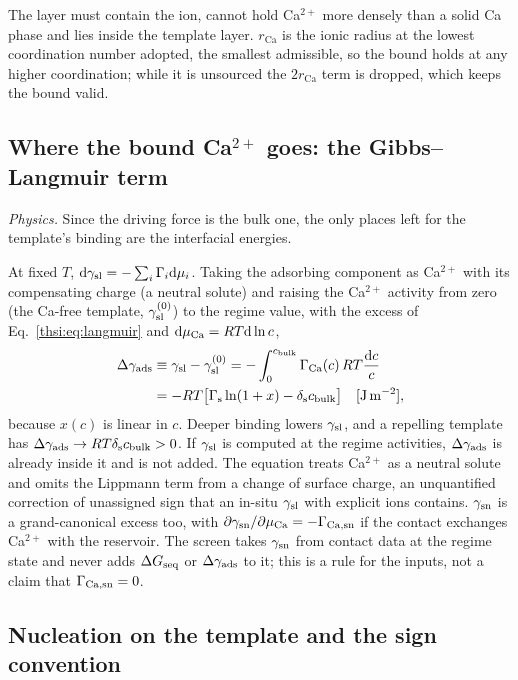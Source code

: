 The layer must contain the ion, cannot hold Ca$^{2+}$ more densely than a solid Ca phase and lies inside
the template layer. $r_\mathrm{Ca}$ is the ionic radius at the lowest coordination number adopted, the
smallest admissible, so the bound holds at any higher coordination; while it is unsourced the
$2r_\mathrm{Ca}$ term is dropped, which keeps the bound valid.

\subsection{Where the bound Ca$^{2+}$ goes: the Gibbs--Langmuir term}\label{thsi:sec:gibbs}

\textit{Physics.} Since the driving force is the bulk one, the only places left for the template's
binding are the interfacial energies.

At fixed $T$, $\mathrm{d}\gamma_\mathrm{sl}=-\sum_i\Gamma_i\mathrm{d}\mu_i$. Taking the adsorbing component as Ca$^{2+}$ with its
compensating charge (a neutral solute) and raising the Ca$^{2+}$ activity from zero (the Ca-free
template, $\gamma_\mathrm{sl}^{(0)}$) to the regime value, with the excess of Eq.~\eqref{thsi:eq:langmuir} and
$\mathrm{d}\mu_\mathrm{Ca}=R T\mathrm{d}\ln c$,
\begin{equation}\label{thsi:eq:gibbs}
\begin{aligned}
\Delta\gamma_\mathrm{ads}&\equiv\gamma_\mathrm{sl}-\gamma_\mathrm{sl}^{(0)}=-\int_0^{c_\mathrm{bulk}}\Gamma_\mathrm{Ca}(c)\,R T\frac{\mathrm{d} c}{c}\\
&=-R T\big[\Gamma_\mathrm{s}\ln(1+x)-\delta_\mathrm{s}c_\mathrm{bulk}\big] \quad[\mathrm{J\,m^{-2}}],
\end{aligned}
\end{equation}
because $x(c)$ is linear in $c$. Deeper binding lowers $\gamma_\mathrm{sl}$, and a repelling template has
$\Delta\gamma_\mathrm{ads}\to R T\delta_\mathrm{s}c_\mathrm{bulk}>0$. If $\gamma_\mathrm{sl}$ is computed at the regime activities, $\Delta\gamma_\mathrm{ads}$ is already inside it and
is not added. The equation treats Ca$^{2+}$ as a neutral solute and omits the Lippmann term from a change
of surface charge, an unquantified correction of unassigned sign that an in-situ $\gamma_\mathrm{sl}$ with explicit
ions contains. $\gamma_\mathrm{sn}$ is a grand-canonical excess too, with $\partial\gamma_\mathrm{sn}/\partial\mu_\mathrm{Ca}=-\Gamma_\mathrm{Ca,sn}$ if
the contact exchanges Ca$^{2+}$ with the reservoir. The screen takes $\gamma_\mathrm{sn}$ from contact data at the
regime state and never adds $\Delta G_\mathrm{seq}$ or $\Delta\gamma_\mathrm{ads}$ to it; this is a rule for the inputs, not a claim that
$\Gamma_\mathrm{Ca,sn}=0$.

\subsection{Nucleation on the template and the sign convention}\label{thsi:sec:nucleation}

